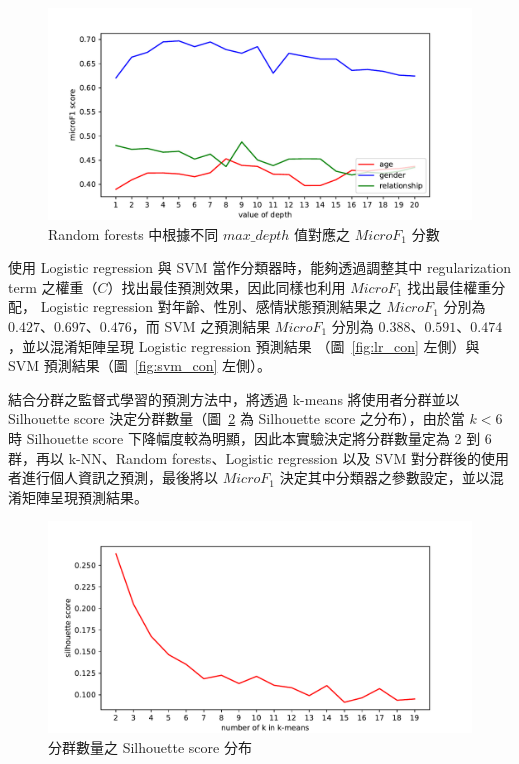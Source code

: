 {\begin{figure}[h]
    \graphicspath{{fig/}}
    \begin{center}
    \includegraphics[scale=0.5]{fig/super_rf_microf1.pdf}
    \caption{ Random forests 中根據不同 $max \_depth$ 值對應之 $MicroF_1$ 分數}
    \label{fig:super_rf_microf1}
    \end{center}
\end{figure}
\clearpage

使用 Logistic regression 與 SVM 當作分類器時，能夠透過調整其中 regularization term 之權重（$C$）找出最佳預測效果，因此同樣也利用 $MicroF_1$ 找出最佳權重分配， Logistic regression 對年齡、性別、感情狀態預測結果之 $MicroF_1$ 分別為 $0.427$、$0.697$、$0.476$，而 SVM 之預測結果 $MicroF_1$ 分別為 $0.388$、$0.591$、$0.474$，並以混淆矩陣呈現 Logistic regression 預測結果
（圖~\ref{fig:lr_con} 左側）與 SVM 預測結果（圖~\ref{fig:svm_con} 左側）。\par

結合分群之監督式學習的預測方法中，將透過 k-means 將使用者分群並以 Silhouette score 決定分群數量（圖~\ref{fig:silhouette_score} 為 Silhouette score 之分布），由於當 $k<6$ 時 Silhouette score 下降幅度較為明顯，因此本實驗決定將分群數量定為 2 到 6 群，再以 k-NN、Random forests、Logistic regression 以及 SVM 對分群後的使用者進行個人資訊之預測，最後將以 $MicroF_1$ 決定其中分類器之參數設定，並以混淆矩陣呈現預測結果。\par

\begin{figure}[h]
    \graphicspath{{fig/}}
    \begin{center}
    \includegraphics[scale=0.6]{fig/silhouette_score.pdf}
    \caption{分群數量之 Silhouette score 分布}
    \label{fig:silhouette_score}
    \end{center}
\end{figure}

}

